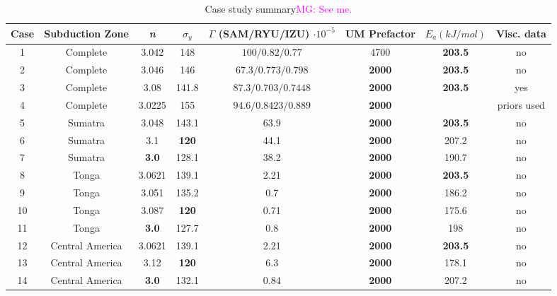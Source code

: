 \documentclass[12pt]{article}
\newcommand{\mgnote}[1]{\textcolor{magenta}{MG: #1}}
\begin{document}
\begin{table}

\centering

	\begin{table}[H]
		\caption{Case study summary\mgnote{See me.}} %
		\centering  %
		\begin{tabular}{c c c c c c c c  } %
		\hline \hline                        %
		Case & Subduction Zone & \textit{n} &$\sigma_y$&$\Gamma$ (SAM/RYU/IZU) $\cdot 10^{-5}$ &UM Prefactor &$E_a (kJ/mol)$&Visc. data   \\ [0.5ex] %
		\hline                  %
	      	 1 &Complete& 3.042 & 148 & $100/0.82/0.77$ &  4700& \textbf{203.5} & no  \\
	        2 &Complete& 3.046 & 146 & $67.3/0.773/0.798$ & \textbf{2000} & \textbf{203.5} & no \\
	        3 &Complete& 3.08 & 141.8 & $87.3/0.703/0.7448$ & \textbf{2000} & \textbf{203.5} & yes \\
	        4 &Complete& 3.0225 & 155 & $94.6/0.8423/0.889$ & \textbf{2000} & & priors used \\
                5 &Sumatra& 3.048 & 143.1 & $63.9$ &  \textbf{2000}& \textbf{203.5}& no \\

                 6 &Sumatra& 3.1 & \textbf{120} & 44.1 & \textbf{2000} & 207.2   &no\\
                  7 &Sumatra& \textbf{3.0} & 128.1 & 38.2 & \textbf{2000} & 190.7   &no\\
              8 &Tonga  & 3.0621 & 139.1 & 2.21& \textbf{2000} & \textbf{203.5} &no  \\              
               9 &Tonga  & 3.051 & 135.2 & 0.7& \textbf{2000} & 186.2 &no  \\             
              10 &Tonga  & 3.087 &  \textbf{120} & 0.71 &\textbf{2000} &175.6  &no  \\              
               11 &Tonga  & \textbf{3.0}  & 127.7 & 0.8 &\textbf{2000} &198  &no  \\             
               12 &Central America  & 3.0621 & 139.1 & 2.21& \textbf{2000} & \textbf{203.5} &no  \\           
                 13 &Central America  & 3.12 & \textbf{120} & 6.3& \textbf{2000} & 178.1 &no  \\       
                 14 &Central America  & \textbf{3.0} & 132.1 & 0.84& \textbf{2000}& 207.2 &no  \\        
          
          
                \hline %
		\end{tabular}
		\label{table:inversions} %
		\end{table}
\end{table}
\end{document}
